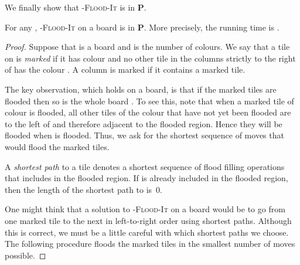 \documentclass[a4paper,11pt]{llncs}
\newcounter{l}
\newcommand{\Ptime}{\ensuremath{\mathbf{P}}}
\newcommand{\Coloroid}[1]{-\textsc{Flood-It}}
\newcommand{\recdim}[2]{}
\begin{document}
We finally show that \Coloroid{(c,2)} is in \Ptime.

\begin{theorem}
    \label{thm:height2}
    For any , \Coloroid{c} on a \recdim{2}{n} board is in \Ptime. More precisely, the running time is .
\end{theorem}
\begin{proof}
    Suppose that  is a \recdim{2}{n} board and  is the number of colours. We say that a tile  on  is \emph{marked} if it has colour  and no other tile in the columns strictly to the right of  has the colour . A column is marked if it contains a marked tile.

    The key observation, which holds on a \recdim{2}{n} board, is that if the marked tiles are flooded then so is the whole board . To see this, note that when a marked tile  of colour  is flooded, all other tiles of the colour  that have not yet been flooded are to the left of  and therefore adjacent to the flooded region. Hence they will be flooded when  is flooded. Thus, we ask for the shortest sequence of moves that would flood the marked tiles.

    A \emph{shortest path} to a tile  denotes a shortest sequence of flood filling operations that includes   in the flooded region. If  is already included in the flooded region, then the length of the shortest path to  is~0.

    One might think that a solution to \Coloroid{c} on a \recdim{2}{n} board would be to go from one marked tile to the next in left-to-right order using shortest paths. Although this is correct, we must be a little careful with which shortest paths we choose. The following procedure floods the marked tiles in the smallest number of moves possible.


\end{proof}
\end{document}
